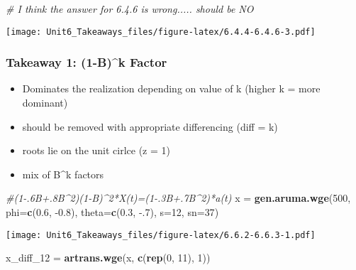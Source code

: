 \documentclass[]{article}
\newenvironment{Shaded}{\begin{snugshade}}{\end{snugshade}}
\newcommand{\CommentTok}[1]{\textcolor[rgb]{0.56,0.35,0.01}{\textit{#1}}}
\newcommand{\DataTypeTok}[1]{\textcolor[rgb]{0.13,0.29,0.53}{#1}}
\newcommand{\DecValTok}[1]{\textcolor[rgb]{0.00,0.00,0.81}{#1}}
\newcommand{\FloatTok}[1]{\textcolor[rgb]{0.00,0.00,0.81}{#1}}
\newcommand{\KeywordTok}[1]{\textcolor[rgb]{0.13,0.29,0.53}{\textbf{#1}}}
\newcommand{\NormalTok}[1]{#1}
\newcommand{\StringTok}[1]{\textcolor[rgb]{0.31,0.60,0.02}{#1}}
\providecommand{\tightlist}{%
  \setlength{\itemsep}{0pt}\setlength{\parskip}{0pt}}
\begin{document}
\begin{Shaded}
\begin{Highlighting}[]
\CommentTok{# I think the answer for 6.4.6 is wrong..... should be NO}
\end{Highlighting}
\end{Shaded}

\texttt{[image: Unit6\_Takeaways\_files/figure-latex/6.4.4-6.4.6-3.pdf]}

\hypertarget{takeaway-1-1-bk-factor}{%
\subsubsection{Takeaway 1: (1-B)\^{}k
Factor}\label{takeaway-1-1-bk-factor}}

\begin{itemize}
\tightlist
\item
  Dominates the realization depending on value of k (higher k = more
  dominant)
\item
  should be removed with appropriate differencing (diff = k)
\item
  roots lie on the unit cirlce (z = 1)
\item
  mix of B\^{}k factors
\end{itemize}

\begin{Shaded}
\begin{Highlighting}[]
\CommentTok{#(1-.6B+.8B^2)(1-B)^2*X(t)=(1-.3B+.7B^2)*a(t)}
\NormalTok{x =}\StringTok{ }\KeywordTok{gen.aruma.wge}\NormalTok{(}\DecValTok{500}\NormalTok{, }\DataTypeTok{phi=}\KeywordTok{c}\NormalTok{(}\FloatTok{0.6}\NormalTok{, }\FloatTok{-0.8}\NormalTok{), }\DataTypeTok{theta=}\KeywordTok{c}\NormalTok{(}\FloatTok{0.3}\NormalTok{, }\FloatTok{-.7}\NormalTok{), }\DataTypeTok{s=}\DecValTok{12}\NormalTok{, }\DataTypeTok{sn=}\DecValTok{37}\NormalTok{)}
\end{Highlighting}
\end{Shaded}

\texttt{[image: Unit6\_Takeaways\_files/figure-latex/6.6.2-6.6.3-1.pdf]}

\begin{Shaded}
\begin{Highlighting}[]
\NormalTok{x_diff_}\DecValTok{12}\NormalTok{ =}\StringTok{ }\KeywordTok{artrans.wge}\NormalTok{(x, }\KeywordTok{c}\NormalTok{(}\KeywordTok{rep}\NormalTok{(}\DecValTok{0}\NormalTok{, }\DecValTok{11}\NormalTok{), }\DecValTok{1}\NormalTok{))}
\end{Highlighting}
\end{Shaded}
\end{document}
